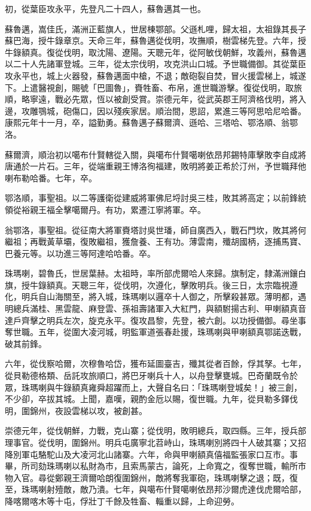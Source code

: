 \begin{pinyinscope}
初，從葉臣攻永平，先登凡二十四人，蘇魯邁其一也。

蘇魯邁，嵩佳氏，滿洲正藍旗人，世居棟鄂部。父遜札哩，歸太祖，太祖錄其長子蘇巴海，授牛錄章京。天命三年，蘇魯邁從伐明，攻撫順，樹雲梯先登。六年，授牛錄額真。復從伐明，取沈陽、遼陽。天聰元年，從阿敏伐朝鮮，攻義州，蘇魯邁以二十人先諸軍登城。三年，從太宗伐明，攻克洪山口城。予世職備御。其從葉臣攻永平也，城上火器發，蘇魯邁面中槍，不退；敵砲裂自焚，冒火援雲梯上，城遂下。上遣醫視創，賜號「巴圖魯」，賚牲畜、布帛，進世職游擊。復從伐明，取旅順，略寧遠，戰必先眾，恆以被創受賞。崇德元年，從武英郡王阿濟格伐明，將入邊，攻雕鶚城，砲傷口，因以殘疾家居。順治間，恩詔，累進三等阿思哈尼哈番。康熙元年十一月，卒，謚勤勇。蘇魯邁子蘇爾濟、遜哈、三塔哈、鄂洛順、翁鄂洛。

蘇爾濟，順治初以噶布什賢轄從入關，與噶布什賢噶喇依昂邦錫特庫擊敗李自成將唐通於一片石。三年，從端重親王博洛徇福建，敗明將姜正希於汀州，予世職拜他喇布勒哈番。七年，卒。

鄂洛順，事聖祖。以二等護衛從建威將軍佛尼埒討吳三桂，敗其將高定；以前鋒統領從裕親王福全擊噶爾丹。有功，累遷江寧將軍。卒。

翁鄂洛，事聖祖。從征南大將軍賚塔討吳世璠，師自廣西入，戰石門坎，敗其將何繼祖；再戰黃草壩，復敗繼祖，獲詹養、王有功。薄雲南，殲胡國柄，逐捕馬寶、巴養元等。以功進三等阿達哈哈番。卒。

珠瑪喇，碧魯氏，世居葉赫。太祖時，率所部虎爾哈人來歸。旗制定，隸滿洲鑲白旗，授牛錄額真。天聰三年，從伐明，次遵化，擊敗明兵。後三日，太宗臨視遵化，明兵自山海關至，將入城，珠瑪喇以邏卒十人御之，所擊殺甚眾。薄明都，遇明總兵滿桂、黑雲龍、麻登雲、孫祖壽諸軍入大紅門，與額駙揚古利、甲喇額真音達戶齊擊之明兵左次，旋克永平。復攻昌黎，先登，被六創。以功授備御。尋坐事奪世職。五年，從圍大凌河城，明監軍道張春赴援，珠瑪喇與甲喇額真鄂諾迭戰，破其前鋒。

六年，從伐察哈爾，次穆魯哈岱，獲布延圖臺吉，殲其從者百餘，俘其孥。七年，從貝勒德格類、岳託攻旅順口，將巴牙喇兵十人，以舟登擊甕城。巴奇蘭既令於眾，珠瑪喇與牛錄額真雍舜超躍而上，大聲自名曰：「珠瑪喇登城矣！」被三創，不少卻，卒拔其城。上聞，嘉嘆，親酌金卮以賜，復世職。九年，從貝勒多鐸伐明，圍錦州，夜設雲梯以攻，被創甚。

崇德元年，從伐朝鮮，力戰，克山寨；從伐明，敗明總兵，取四縣。三年，授兵部理事官。從伐明，圍錦州。明兵屯廣寧北苕峙山，珠瑪喇別將四十人破其寨；又招降別軍屯駱駝山及大凌河北山諸寨。六年，命與甲喇額真僖福監張家口互市。事畢，所司劾珠瑪喇以私財為市，且索馬蒙古，論死，上命寬之，復奪世職，輸所市物入官。尋從鄭親王濟爾哈朗復圍錦州，敵將奪我軍砲，珠瑪喇擊之退；既，復至，珠瑪喇射殪敵，敵乃潰。七年，與噶布什賢噶喇依昂邦沙爾虎達伐虎爾哈部，降喀爾喀木等十屯，俘壯丁千餘及牲畜、輜重以歸，上命迎勞。


\end{pinyinscope}
